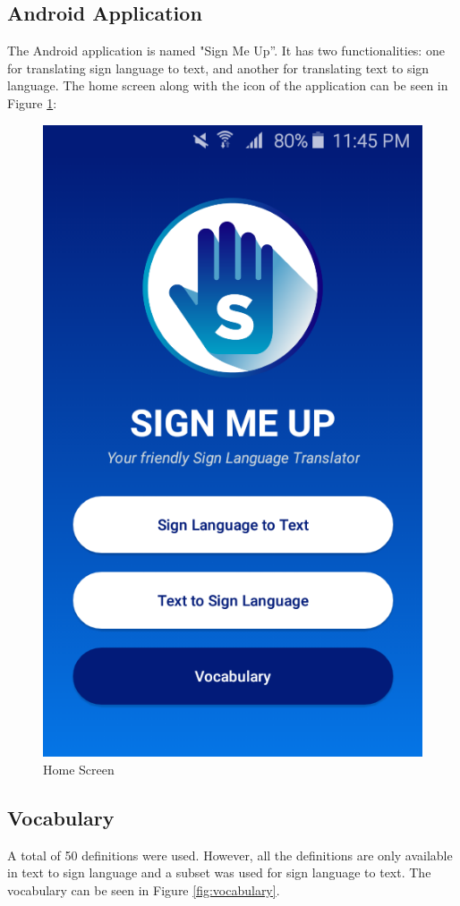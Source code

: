 \documentclass[journal]{./IEEE/IEEEtran}
\begin{document}
\subsection{Android Application}
The Android application is named "Sign Me Up''. It has two functionalities: one for translating sign language to text, and another for translating text to sign language. The home screen along with the icon of the application can be seen in Figure \ref{fig:home}:

\begin{figure}[ht!]
    \centering
    \includegraphics[width=0.75\linewidth]{./images/screen_home.png}
    \caption{Home Screen}
    \label{fig:home}
\end{figure}

\subsection{Vocabulary}
A total of 50 definitions were used. However, all the definitions are only available in text to sign language and a subset was used for sign language to text. The vocabulary can be seen in Figure \ref{fig:vocabulary}. 
\end{document}
